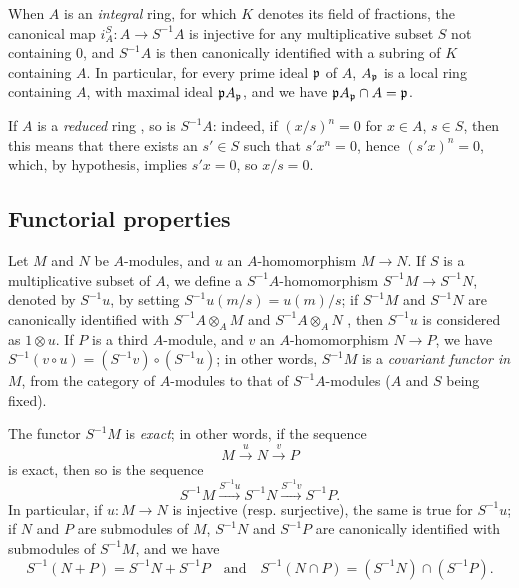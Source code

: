 \begin{env}[1.2.7]
\label{0.1.2.7}
When $A$ is an {\em integral} ring, for which $K$ denotes its field of
fractions, the canonical map $i_A^S:A\to S^{-1}A$ is injective for any
multiplicative subset $S$ not containing $0$, and $S^{-1}A$ is then canonically identified
with a subring of $K$ containing $A$. In particular, for every prime
ideal $\mathfrak{p}$ of $A$, $A_\mathfrak{p}$ is a local ring containing $A$,
with maximal ideal $\mathfrak{p}A_\mathfrak{p}$, and we have
$\mathfrak{p}A_\mathfrak{p}\cap A=\mathfrak{p}$.
\end{env}

\begin{env}[1.2.8]
\label{0.1.2.8}
If $A$ is a {\em reduced} ring , so is $S^{-1}A$: indeed, if
$(x/s)^n=0$ for $x\in A$, $s\in S$, then this means that there exists an
$s'\in S$ such that $s' x^n=0$, hence $(s' x)^n=0$, which, by hypothesis, implies
$s' x=0$, so $x/s=0$.
\end{env}

\subsection{Functorial properties}
\label{subsection-func-ring-of-fractions}

\begin{env}[1.3.1]
\label{0.1.3.1}
Let $M$ and $N$ be $A$-modules, and $u$ an $A$-homomorphism $M\to N$. If $S$ is a
multiplicative subset of $A$, we define a $S^{-1}A$-homomorphism
$S^{-1}M\to S^{-1}N$, denoted by $S^{-1}u$, by setting $S^{-1}u(m/s)=u(m)/s$; if
$S^{-1}M$ and $S^{-1}N$ are canonically identified with $S^{-1}A\otimes_A M$ and
$S^{-1}A\otimes_A N$ , then $S^{-1}u$ is considered as $1\otimes u$.
If $P$ is a third $A$-module, and $v$ an $A$-homomorphism $N\to P$, we have
$S^{-1}(v\circ u)=(S^{-1}v)\circ(S^{-1}u)$; in other words, $S^{-1}M$ is a
{\em covariant functor in $M$}, from the category of $A$-modules to that of
$S^{-1}A$-modules ($A$ and $S$ being fixed).
\end{env}

\begin{env}[1.3.2]
\label{0.1.3.2}
The functor $S^{-1}M$ is {\em exact}; in other words, if the sequence
\[
  M\xrightarrow{u}N\xrightarrow{v}P
\]
is exact, then so is the sequence
\[
  S^{-1}M\xrightarrow{S^{-1}u}S^{-1}N\xrightarrow{S^{-1}v}S^{-1}P.
\]
In particular, if $u:M\to N$ is injective (resp. surjective), the same is true
for $S^{-1}u$;
if $N$ and $P$ are submodules of $M$, $S^{-1}N$ and $S^{-1}P$ are canonically identified with submodules of $S^{-1}M$, and we have
\[
  S^{-1}(N+P)=S^{-1}N+S^{-1}P
  \quad\text{and}\quad
  S^{-1}(N\cap P)=(S^{-1}N)\cap(S^{-1}P).
\]
\end{env}

